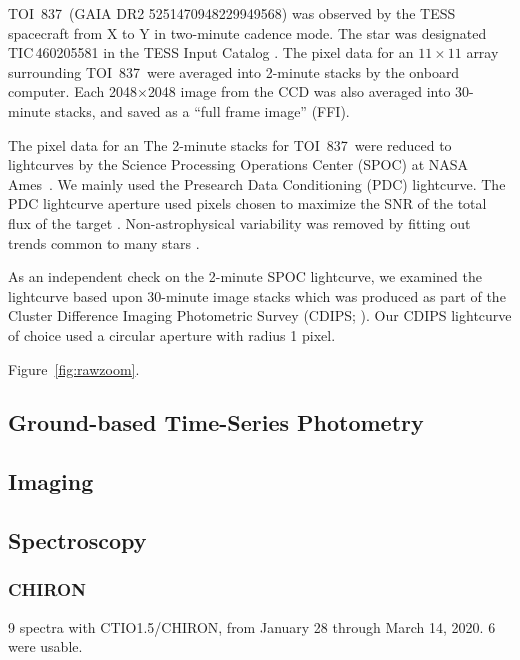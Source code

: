 \documentclass[12pt,twocolumn,tighten]{aastex62}
\newcommand{\tn}{TOI~837} %
\begin{document}
\tn\ (GAIA DR2 5251470948229949568) was observed by the
TESS spacecraft from X to Y in two-minute cadence mode.
The star was designated
TIC\,460205581 in the TESS Input Catalog
\citep{stassun_TIC_2018,stassun_TIC8_2019}.
The pixel data for an
$11\times11$ array surrounding \tn\ were averaged into 2-minute
stacks by the onboard computer.  Each 2048$\times$2048 image from the
CCD was also averaged into 30-minute stacks, and saved as a ``full
frame image'' (FFI).

The pixel data for an
The 2-minute stacks for \tn\ were reduced to lightcurves by the
Science Processing Operations Center (SPOC) at NASA
Ames~\citep{jenkins_tess_2016}.  We mainly used the Presearch Data
Conditioning (PDC) lightcurve.  The PDC lightcurve aperture used
pixels chosen to maximize the SNR of the total flux of the target
\citep{smith_finding_2016}.  Non-astrophysical variability
was removed by fitting out trends common to many stars
\citep{smith_kepler_2012,stumpe_multiscale_2014}.

As an independent check on the 2-minute SPOC lightcurve, we examined
the lightcurve based upon 30-minute image stacks which was produced as
part of the Cluster Difference Imaging Photometric Survey (CDIPS;
\citealt{bouma_cluster_2019}).  Our CDIPS lightcurve of choice used a
circular aperture with radius 1 pixel.



Figure~\ref{fig:rawzoom}.

\subsection{Ground-based Time-Series Photometry}
\label{subsec:groundphot}

  

\subsection{Imaging}

\subsection{Spectroscopy}

\subsubsection{CHIRON}
9 spectra with CTIO1.5/CHIRON, from January 28 through March 14, 2020.
6 were usable.
\end{document}
